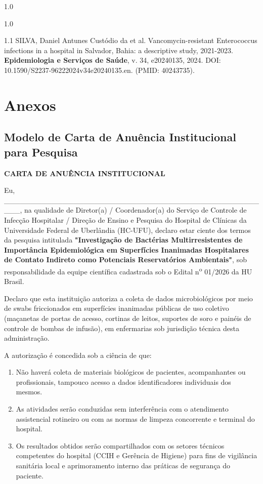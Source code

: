 \documentclass[12pt,a4paper]{article}
\begin{document}
\begin{spacing}{1.0}
\begin{spacing}{1.0}
\begin{spacing}{1.1}
\vspace{12pt}
\noindent SILVA, Daniel Antunes Custódio da et al. Vancomycin-resistant Enterococcus infections in a hospital in Salvador, Bahia: a descriptive study, 2021-2023. \textbf{Epidemiologia e Serviços de Saúde}, v. 34, e20240135, 2024. DOI: 10.1590/S2237-96222024v34e20240135.en. (PMID: 40243735).
\end{spacing}
\newpage

\section{Anexos}

\subsection{Modelo de Carta de Anuência Institucional para Pesquisa}

\begin{center}
    \textbf{CARTA DE ANUÊNCIA INSTITUCIONAL}
\end{center}

\noindent Eu, \_\_\_\_\_\_\_\_\_\_\_\_\_\_\_\_\_\_\_\_\_\_\_\_\_\_\_\_\_\_\_\_\_\_\_\_\_\_\_\_\_\_\_\_\_\_\_\_\_\_\_, na qualidade de Diretor(a) / Coordenador(a) do Serviço de Controle de Infecção Hospitalar / Direção de Ensino e Pesquisa do Hospital de Clínicas da Universidade Federal de Uberlândia (HC-UFU), declaro estar ciente dos termos da pesquisa intitulada \textbf{"Investigação de Bactérias Multirresistentes de Importância Epidemiológica em Superfícies Inanimadas Hospitalares de Contato Indireto como Potenciais Reservatórios Ambientais"}, sob responsabilidade da equipe científica cadastrada sob o Edital n\textsuperscript{o} 01/2026 da HU Brasil.

Declaro que esta instituição autoriza a coleta de dados microbiológicos por meio de swabs friccionados em superfícies inanimadas públicas de uso coletivo (maçanetas de portas de acesso, cortinas de leitos, suportes de soro e painéis de controle de bombas de infusão), em enfermarias sob jurisdição técnica desta administração.

A autorização é concedida sob a ciência de que:
\begin{enumerate}
    \item Não haverá coleta de materiais biológicos de pacientes, acompanhantes ou profissionais, tampouco acesso a dados identificadores individuais dos mesmos.
    \item As atividades serão conduzidas sem interferência com o atendimento assistencial rotineiro ou com as normas de limpeza concorrente e terminal do hospital.
    \item Os resultados obtidos serão compartilhados com os setores técnicos competentes do hospital (CCIH e Gerência de Higiene) para fins de vigilância sanitária local e aprimoramento interno das práticas de segurança do paciente.
\end{enumerate}


\end{spacing}
\end{spacing}
\end{document}
